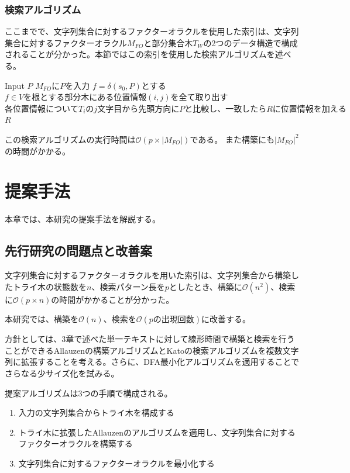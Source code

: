 \documentclass[11pt,a4paper]{jreport}
\begin{document}
  \subsection{検索アルゴリズム}
  ここまでで、文字列集合に対するファクターオラクルを使用した索引は、文字列集合に対するファクターオラクル$M_{FO}$と部分集合木$T_W$の2つのデータ構造で構成されることが分かった。本節ではこの索引を使用した検索アルゴリズムを述べる。

  \begin{algorithm}
    \caption{$\textbf{Search}(P)$}
    \label{alg6}
    \begin{algorithmic}
      \State Input $P$
      \State $M_{FO}にPを入力$
      \State $f=\delta(s_0,P)とする$
      \State $f \in Vを根とする部分木にある位置情報(i,j)を全て取り出す$
      \EndIf
      \State $各位置情報についてT_iのj文字目から先頭方向にPと比較し、一致したらRに位置情報を加える$
      \Return $R$
    \end{algorithmic}
  \end{algorithm}

  この検索アルゴリズムの実行時間は$\mathcal{O}(p \times |M_{FO}|)$である。
  また構築にも$|M_{FO}|^2$の時間がかかる。

  \chapter{提案手法}
  本章では、本研究の提案手法を解説する。

  \section{先行研究の問題点と改善案}
  文字列集合に対するファクターオラクルを用いた索引は、文字列集合から構築したトライ木の状態数を$n$、検索パターン長を$p$としたとき、構築に$\mathcal{O}(n^2)$、検索に$\mathcal{O}(p \times n)$の時間がかかることが分かった。

  本研究では、構築を$\mathcal{O}(n)$、検索を$\mathcal{O}(pの出現回数)$に改善する。

  方針としては、3章で述べた単一テキストに対して線形時間で構築と検索を行うことができるAllauzenの構築アルゴリズムとKatoの検索アルゴリズムを複数文字列に拡張することを考える。さらに、DFA最小化アルゴリズムを適用することでさらなる少サイズ化を試みる。

  提案アルゴリズムは3つの手順で構成される。
  \begin{enumerate}
    \item 入力の文字列集合からトライ木を構成する
    \item トライ木に拡張したAllauzenのアルゴリズムを適用し、文字列集合に対するファクターオラクルを構築する
    \item 文字列集合に対するファクターオラクルを最小化する
  \end{enumerate}
\end{document}
